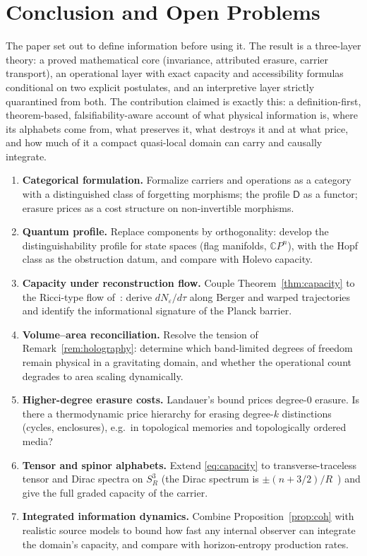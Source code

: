\documentclass[11pt,a4paper]{article}
\theoremstyle{definition}
\theoremstyle{remark}
\newcommand{\Sthree}{S^{3}}
\newcommand{\CP}{\mathbb{C}P}
\newcommand{\Dd}{\mathsf{D}}
\begin{document}
\section{Conclusion and Open Problems}
\label{sec:open}

The paper set out to define information before using it.  The result is a three-layer theory:
a proved mathematical core (invariance, attributed erasure, carrier transport), an operational
layer with exact capacity and accessibility formulas conditional on two explicit postulates, and
an interpretive layer strictly quarantined from both.  The contribution claimed is exactly
this: a definition-first, theorem-based, falsifiability-aware account of what physical
information is, where its alphabets come from, what preserves it, what destroys it and at what
price, and how much of it a compact quasi-local domain can carry and causally integrate.

\begin{enumerate}[label=\textbf{OP\arabic*.},leftmargin=2.2em]
\item \textbf{Categorical formulation.}  Formalize carriers and operations as a category with a
distinguished class of forgetting morphisms; the profile $\Dd$ as a functor; erasure prices as a
cost structure on non-invertible morphisms.
\item \textbf{Quantum profile.}  Replace components by orthogonality: develop the
distinguishability profile for state spaces (flag manifolds, $\CP^{n}$), with the Hopf class as
the obstruction datum, and compare with Holevo capacity.
\item \textbf{Capacity under reconstruction flow.}  Couple Theorem~\ref{thm:capacity} to the
Ricci-type flow of~\cite{BP2026ricci}: derive $dN_{\varepsilon}/d\tau$ along Berger and warped
trajectories and identify the informational signature of the Planck barrier.
\item \textbf{Volume--area reconciliation.}  Resolve the tension of
Remark~\ref{rem:holography}: determine which band-limited degrees of freedom remain physical in
a gravitating domain, and whether the operational count degrades to area scaling dynamically.
\item \textbf{Higher-degree erasure costs.}  Landauer's bound prices degree-$0$ erasure.  Is
there a thermodynamic price hierarchy for erasing degree-$k$ distinctions (cycles, enclosures),
e.g.\ in topological memories and topologically ordered media?
\item \textbf{Tensor and spinor alphabets.}  Extend \eqref{eq:capacity} to transverse-traceless
tensor and Dirac spectra on $\Sthree_{R}$ (the Dirac spectrum is
$\pm(n+3/2)/R$~\cite{PB2026susp}) and give the full graded capacity of the carrier.
\item \textbf{Integrated information dynamics.}  Combine Proposition~\ref{prop:coh} with
realistic source models to bound how fast any internal observer can integrate the domain's
capacity, and compare with horizon-entropy production rates.
\end{enumerate}
\end{document}
